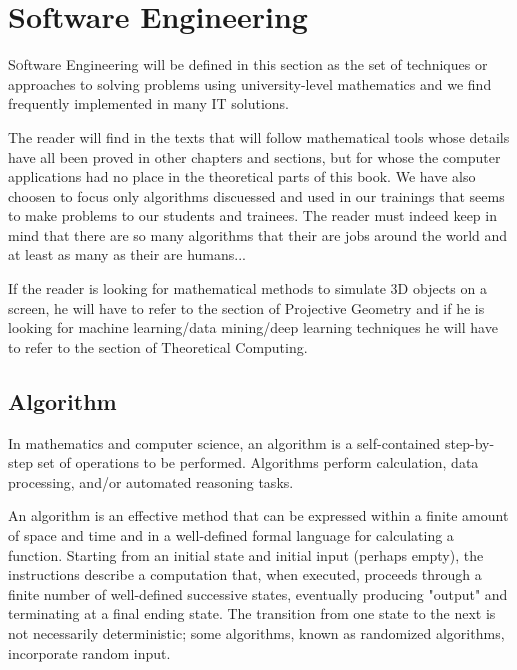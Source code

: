 	\newpage
	\thispagestyle{empty}
	\mbox{}
	\section{Software Engineering}
	\lettrine[lines=4]{\color{BrickRed}S}oftware Engineering will be defined in this section as the set of techniques or approaches to solving problems using university-level mathematics and we find frequently implemented in many IT solutions.
	
	The reader will find in the texts that will follow mathematical tools whose details have all been proved in other chapters and sections, but for whose the computer applications had no place in the theoretical parts of this book. We have also choosen to focus only algorithms discuessed and used in our trainings that seems to make problems to our students and trainees. The reader must indeed keep in mind that there are so many algorithms that their are jobs around the world and at least as many as their are humans...
	
	\begin{tcolorbox}[title=Remark,colframe=black,arc=10pt]
	If the reader is looking for mathematical methods to simulate 3D objects on a screen, he will have to refer to the section of Projective Geometry and if he is looking for machine learning/data mining/deep learning techniques he will have to refer to the section of Theoretical Computing.
	\end{tcolorbox}
	
	\subsection{Algorithm}
	In mathematics and computer science, an algorithm  is a self-contained step-by-step set of operations to be performed. Algorithms perform calculation, data processing, and/or automated reasoning tasks.

	An algorithm is an effective method that can be expressed within a finite amount of space and time and in a well-defined formal language for calculating a function. Starting from an initial state and initial input (perhaps empty), the instructions describe a computation that, when executed, proceeds through a finite number of well-defined successive states, eventually producing "output" and terminating at a final ending state. The transition from one state to the next is not necessarily deterministic; some algorithms, known as randomized algorithms, incorporate random input.

